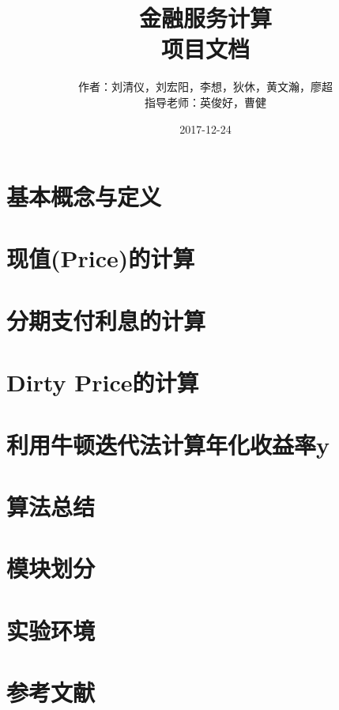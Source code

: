 \documentclass[12pt]{article}
\begin{document}
\begin{CJK}{UTF8}{song}

\newcommand{\bN}{\mathbb{N}}
\newcommand{\tabincell}[2]{\begin{tabular}{@{}#1@{}}#2\end{tabular}}  

\title{金融服务计算\\项目文档}
\date{2017-12-24}
\author{作者：刘清仪，刘宏阳，李想，狄休，黄文瀚，廖超\\指导老师：英俊好，曹健}



\maketitle

\tableofcontents

\newpage
\section{基本概念与定义}

 

\newpage
\section{现值(Price)的计算}


\newpage
\section{分期支付利息的计算}


\newpage
\section{Dirty Price的计算}


\newpage
\section{利用牛顿迭代法计算年化收益率y}


\newpage
\section{算法总结}


\newpage
\section{模块划分}


\newpage
\section{实验环境}


\newpage
\section{参考文献}



\end{CJK}
\end{document}
